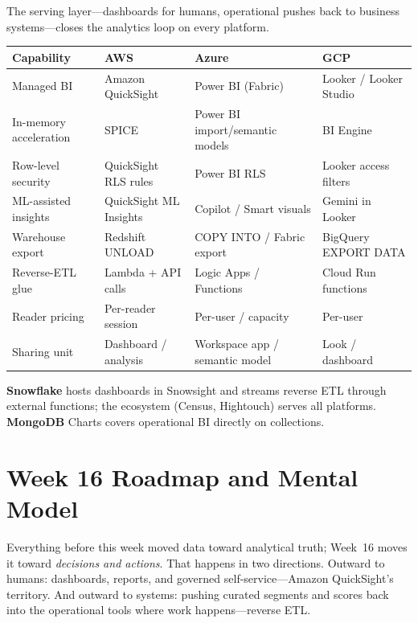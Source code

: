 \begin{crosscloud}
The serving layer---dashboards for humans, operational pushes back to business systems---closes the analytics loop on every platform.

\vspace{2mm}
{\footnotesize
\begin{tabular}{@{}p{2.8cm}p{3.0cm}p{3.0cm}p{3.0cm}@{}}
\toprule
\textbf{Capability} & \textbf{AWS} & \textbf{Azure} & \textbf{GCP} \\
\midrule
Managed BI & Amazon QuickSight & Power BI (Fabric) & Looker / Looker Studio \\
In-memory acceleration & SPICE & Power BI import/semantic models & BI Engine \\
Row-level security & QuickSight RLS rules & Power BI RLS & Looker access filters \\
ML-assisted insights & QuickSight ML Insights & Copilot / Smart visuals & Gemini in Looker \\
Warehouse export & Redshift UNLOAD & COPY INTO / Fabric export & BigQuery EXPORT DATA \\
Reverse-ETL glue & Lambda + API calls & Logic Apps / Functions & Cloud Run functions \\
\addlinespace
Reader pricing & Per-reader session & Per-user / capacity & Per-user \\
Sharing unit & Dashboard / analysis & Workspace app / semantic model & Look / dashboard \\
\bottomrule
\end{tabular}}

\vspace{1mm}
\textbf{Snowflake} hosts dashboards in Snowsight and streams reverse ETL through external functions; the ecosystem (Census, Hightouch) serves all platforms. \textbf{MongoDB} Charts covers operational BI directly on collections.
\end{crosscloud}

\section{Week 16 Roadmap and Mental Model}
Everything before this week moved data toward analytical truth; Week~16 moves it toward \emph{decisions and actions}. That happens in two directions. Outward to humans: dashboards, reports, and governed self-service---Amazon QuickSight's territory. And outward to systems: pushing curated segments and scores back into the operational tools where work happens---reverse ETL.

